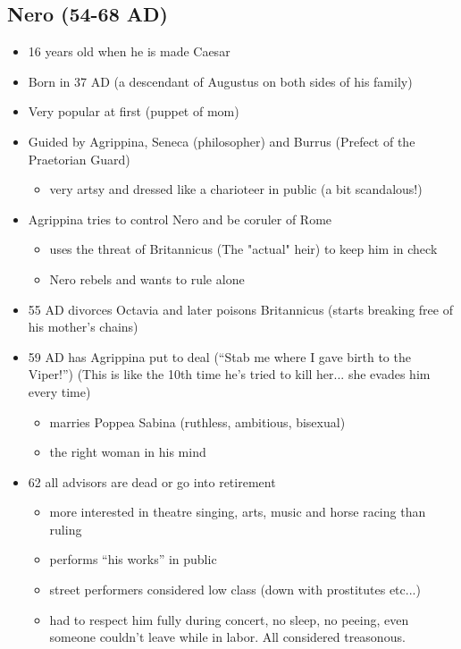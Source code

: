 \documentclass[12pt, twoside]{article}
\begin{document}
\subsection{Nero (54-68 AD)}
\begin{itemize}
\item 16 years old when he is made Caesar
\item Born in 37 AD (a descendant of Augustus on both sides of his family)
\item Very popular at first (puppet of mom)
\item Guided by Agrippina, Seneca (philosopher) and Burrus (Prefect of the Praetorian Guard)
	\begin{itemize}
	\item very artsy and dressed like a charioteer in public (a bit scandalous!)
	\end{itemize}
\item Agrippina tries to control Nero and be coruler of Rome
	\begin{itemize}
	\item uses the threat of Britannicus (The "actual" heir) to keep him in check
	\item Nero rebels and wants to rule alone
	\end{itemize}
\item 55 AD divorces Octavia and later poisons Britannicus (starts breaking free of his mother's chains)
\item 59 AD has Agrippina put to deal (“Stab me where I gave birth to the Viper!”) (This is like the 10th time he's tried to kill her... she evades him every time)
	\begin{itemize}
	\item marries Poppea Sabina (ruthless, ambitious, bisexual)
	\item the right woman in his mind
	\end{itemize}
\item 62 all advisors are dead or go into retirement
	\begin{itemize}
	\item more interested in theatre singing, arts, music and horse racing than ruling
	\item performs “his works” in public
	\item street performers considered low class (down with prostitutes etc...)
	\item had to respect him fully during concert, no sleep, no peeing, even someone couldn't leave while in labor.  All considered treasonous.
	\end{itemize}

\end{itemize}
\end{document}
